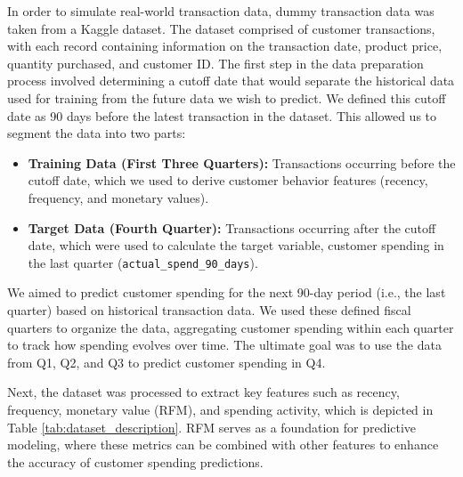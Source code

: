 \documentclass{scrartcl}
\begin{document}
In order to simulate real-world transaction data, dummy transaction data was taken from a Kaggle dataset\cite{rehman2023retail}. The dataset comprised of customer transactions, with each record containing information on the transaction date, product price, quantity purchased, and customer ID. The first step in the data preparation process involved determining a cutoff date that would separate the historical data used for training from the future data we wish to predict. We defined this cutoff date as 90 days before the latest transaction in the dataset. This allowed us to segment the data into two parts:

\begin{itemize}
    \item \textbf{Training Data (First Three Quarters):} Transactions occurring before the cutoff date, which we used to derive customer behavior features (recency, frequency, and monetary values).
    \item \textbf{Target Data (Fourth Quarter):} Transactions occurring after the cutoff date, which were used to calculate the target variable, customer spending in the last quarter (\texttt{actual\_spend\_90\_days}).
\end{itemize}

We aimed to predict customer spending for the next 90-day period (i.e., the last quarter) based on historical transaction data. We used these defined fiscal quarters to organize the data, aggregating customer spending within each quarter to track how spending evolves over time. The ultimate goal was to use the data from Q1, Q2, and Q3 to predict customer spending in Q4.

Next, the dataset was processed to extract key features such as recency, frequency, monetary value (RFM), and spending activity, which is depicted in Table \ref{tab:dataset_description}. RFM serves as a foundation for predictive modeling, where these metrics can be combined with other features to enhance the accuracy of customer spending predictions. 
\end{document}
